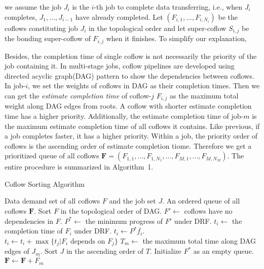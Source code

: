 \documentclass[10pt, conference, letterpaper]{IEEEtran}
\begin{document}
we assume the job $J_i$ is the $i$-th job to complete data transferring, i.e., when $J_i$ completes, $J_1,\dots,J_{i-1}$ have already completed. Let $(F_{i,1},\dots,F_{i,N_i})$ be the coflows constituting job $J_i$ in the topological order and let super-coflow $S_{i,j}$ be the bonding super-coflow of $F_{i,j}$ when it finishes. To simplify our explanation, 

Besides, the completion time of single coflow is not necessarily the priority of the job containing it. In multi-stage jobs, coflow pipelines are developed using directed acyclic graph(DAG) pattern to show the dependencies between coflows. In job-$i$, we set the weights of coflows in DAG as their completion times. Then we can get the \emph{estimate completion time} of coflow-$j$ $F_{i,j}$ as the maximum total weight along DAG edges from roots. A coflow with shorter estimate completion time has a higher priority. Additionally, the estimate completion time of job-$m$ is the maximum estimate completion time of all coflows it contains. Like previous, if a job completes faster, it has a higher priority. Within a job, the priority order of coflows is the ascending order of estimate completion tiome. Therefore we get a prioritized queue of all coflows $\mathbf{F} = (F_{1,1},\dots,F_{1,N_1},\dots,F_{M,1},\dots,F_{M,N_M})$. The entire procedure is summarized in Algorithm~1.

\begin{algorithm}
	\caption{Coflow Sorting Algorithm}
	\begin{algorithmic}[1]
		\Require Data demand set of all coflows $F$ and the job set $J$.
		\Ensure An ordered queue of all coflows $\mathbf{F}$. 
		\State Sort $F$ in the topological order of DAG.
		\State $F' \gets $ coflows have no dependencies in $F$.
		\State $P^* \gets$ the minimum progress of $F'$ under DRF.
				\State $t_i \gets$ the completion time of $F_i$ under DRF.
			\Else
				\State $t_i \gets P^*\overline{f_i}$.
			\EndIf
				\State $t_i \gets t_i + \max{\{t_j|F_i \text{ depends on } F_j\}}$
			\EndIf
		\EndFor
		\State $T_m \gets$ the maximum total time along DAG edges of $J_m$.
		\State Sort $J$ in the ascending order of $T$.
		\State Initialize $F^*$ as an empty queue.
			\State $\mathbf{F} \gets \mathbf{F} + \overline{F_m}$
		\EndFor
	\end{algorithmic}
\end{algorithm}
\end{document}
